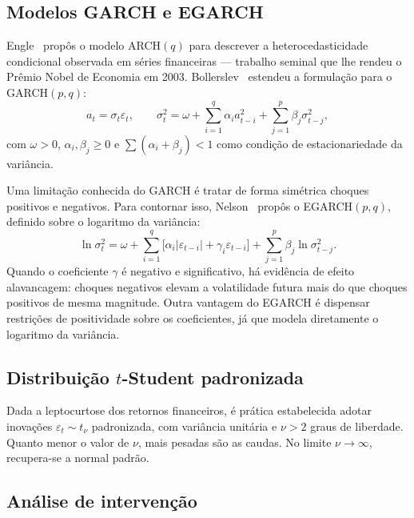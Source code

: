 \documentclass[12pt, a4paper]{article}
\begin{document}
\subsection{Modelos GARCH e EGARCH}

Engle~\cite{engle1982} propôs o modelo ARCH$(q)$ para descrever a heterocedasticidade condicional observada em séries financeiras --- trabalho seminal que lhe rendeu o Prêmio Nobel de Economia em 2003. Bollerslev~\cite{bollerslev1986} estendeu a formulação para o GARCH$(p,q)$:
\begin{equation}
    a_t = \sigma_t \varepsilon_t, \qquad
    \sigma_t^2 = \omega + \sum_{i=1}^{q} \alpha_i a_{t-i}^2 + \sum_{j=1}^{p} \beta_j \sigma_{t-j}^2,
\end{equation}
com $\omega > 0$, $\alpha_i, \beta_j \geq 0$ e $\sum (\alpha_i + \beta_j) < 1$ como condição de estacionariedade da variância.

Uma limitação conhecida do GARCH é tratar de forma simétrica choques positivos e negativos. Para contornar isso, Nelson~\cite{nelson1991} propôs o EGARCH$(p,q)$, definido sobre o logaritmo da variância:
\begin{equation}
    \ln \sigma_t^2 = \omega + \sum_{i=1}^{q} \big[ \alpha_i |\varepsilon_{t-i}| + \gamma_i \varepsilon_{t-i} \big] + \sum_{j=1}^{p} \beta_j \ln \sigma_{t-j}^2.
\end{equation}
Quando o coeficiente $\gamma$ é negativo e significativo, há evidência de efeito alavancagem: choques negativos elevam a volatilidade futura mais do que choques positivos de mesma magnitude. Outra vantagem do EGARCH é dispensar restrições de positividade sobre os coeficientes, já que modela diretamente o logaritmo da variância.

\subsection{Distribuição $t$-Student padronizada}

Dada a leptocurtose dos retornos financeiros, é prática estabelecida adotar inovações $\varepsilon_t \sim t_\nu$ padronizada, com variância unitária e $\nu > 2$ graus de liberdade. Quanto menor o valor de $\nu$, mais pesadas são as caudas. No limite $\nu \to \infty$, recupera-se a normal padrão.

\subsection{Análise de intervenção}
\end{document}
